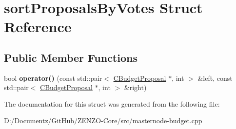 \hypertarget{structsort_proposals_by_votes}{}\section{sort\+Proposals\+By\+Votes Struct Reference}
\label{structsort_proposals_by_votes}
\subsection*{Public Member Functions}
\begin{DoxyCompactItemize}
\item 
\mbox{\label{structsort_proposals_by_votes_a277efd32d95c5d0c534a88d6904689de}} 
bool {\bfseries operator()} (const std\+::pair$<$ \mbox{\hyperlink{class_c_budget_proposal}{C\+Budget\+Proposal}} $\ast$, int $>$ \&left, const std\+::pair$<$ \mbox{\hyperlink{class_c_budget_proposal}{C\+Budget\+Proposal}} $\ast$, int $>$ \&right)
\end{DoxyCompactItemize}


The documentation for this struct was generated from the following file\+:\begin{DoxyCompactItemize}
\item 
D\+:/\+Documentz/\+Git\+Hub/\+Z\+E\+N\+Z\+O-\/\+Core/src/masternode-\/budget.\+cpp\end{DoxyCompactItemize}
